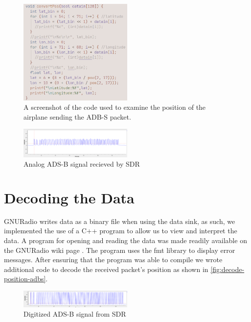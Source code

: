 \documentclass[journal, onecolumn]{IEEEtran}
\begin{document}
\begin{figure}
  \begin{center}
    \includegraphics[width=0.5\textwidth]{./figures/fig_decode_position.png}
  \end{center}
  \caption{A screenshot of the code used to examine the position of the airplane sending the ADB-S packet.}\label{fig:decode-position-adbs}
\end{figure}

\begin{figure}
  \begin{center}
    \includegraphics[width=0.5\textwidth]{./figures/fig_ADSB_recv_analog.png}
  \end{center}
  \caption{Analog ADS-B signal recieved by SDR}\label{fig:analog_rec}
\end{figure}

\section{Decoding the Data}
GNURadio writes data as a binary file when using the data sink, as such, we implemented the use of a C++ program to allow us to view and interpret the data. A program for opening and reading the data was made readily available on the GNURadio wiki page \cite{gnuradio-reading-file-cpp}. 
The program uses the fmt library\cite{fmt-library} to display error messages.
After ensuring that the program was able to compile we wrote additional code to decode the received packet's position as shown in \autoref{fig:decode-position-adbs}.

\begin{figure}
  \begin{center}
    \includegraphics[width=0.5\textwidth]{./figures/fig_ADSB_recv_digital.png}
  \end{center}
  \caption{Digitized ADS-B signal from SDR}\label{fig:digital}
\end{figure}
\end{document}
